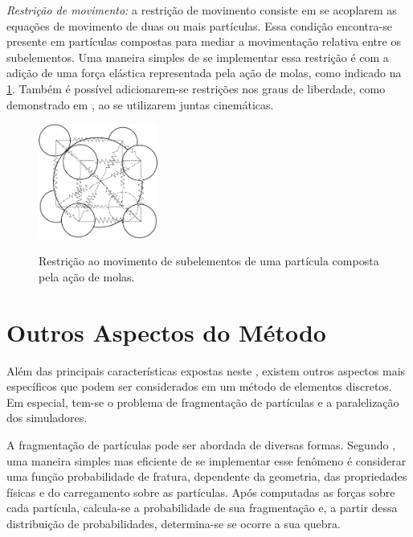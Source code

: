 \begin{alineas}
\item \textit{Restrição de movimento:} a restrição de movimento consiste em se acoplarem as equações de movimento de duas ou mais partículas. Essa condição encontra-se presente em partículas compostas para mediar a movimentação relativa entre os subelementos. Uma maneira simples de se implementar essa restrição é com a adição de uma força elástica representada pela ação de molas, como indicado na \cref{fig:boundary_conditions:restrition}. Também é possível adicionarem-se restrições nos graus de liberdade, como demonstrado em , ao se utilizarem juntas cinemáticas.

\begin{figure}[h]
	\caption{Restrição ao movimento de subelementos de uma partícula composta pela ação de molas.}
	\centering
		\includegraphics[width=0.35\textwidth]{images/discrete_element_method/boundary_conditions/composite_particle_strings.png}
	\label{fig:boundary_conditions:restrition}
\end{figure}
\end{alineas}

\section{Outros Aspectos do Método}

Além das principais características expostas neste , existem outros aspectos mais específicos que podem ser considerados em um método de elementos discretos. Em especial, tem-se o problema de fragmentação de partículas e a paralelização dos simuladores.

A fragmentação de partículas pode ser abordada de diversas formas. Segundo , uma maneira simples mas eficiente de se implementar esse fenômeno é considerar uma função probabilidade de fratura, dependente da geometria, das propriedades físicas e do carregamento sobre as partículas. Após computadas as forças sobre cada partícula, calcula-se a probabilidade de sua fragmentação e, a partir dessa distribuição de probabilidades, determina-se se ocorre a sua quebra.

